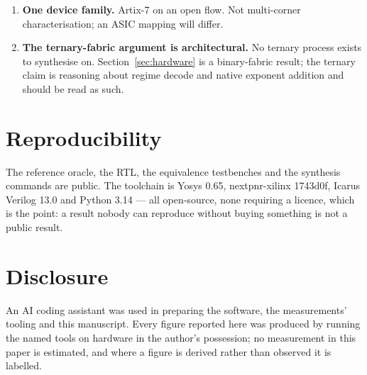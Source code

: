 \documentclass[11pt]{article}
\begin{document}
\begin{enumerate}[leftmargin=*]
\item \textbf{One device family.} Artix-7 on an open flow. Not multi-corner
characterisation; an ASIC mapping will differ.

\item \textbf{The ternary-fabric argument is architectural.} No ternary process
exists to synthesise on. Section~\ref{sec:hardware} is a binary-fabric result;
the ternary claim is reasoning about regime decode and native exponent addition
and should be read as such.
\end{enumerate}

\section*{Reproducibility}

The reference oracle, the RTL, the equivalence testbenches and the synthesis
commands are public. The toolchain is Yosys 0.65, nextpnr-xilinx 1743d0f,
Icarus Verilog 13.0 and Python 3.14 --- all open-source, none requiring a
licence, which is the point: a result nobody can reproduce without buying
something is not a public result.

\section*{Disclosure}

An AI coding assistant was used in preparing the software, the measurements'
tooling and this manuscript. Every figure reported here was produced by running
the named tools on hardware in the author's possession; no measurement in this
paper is estimated, and where a figure is derived rather than observed it is
labelled.
\end{document}
